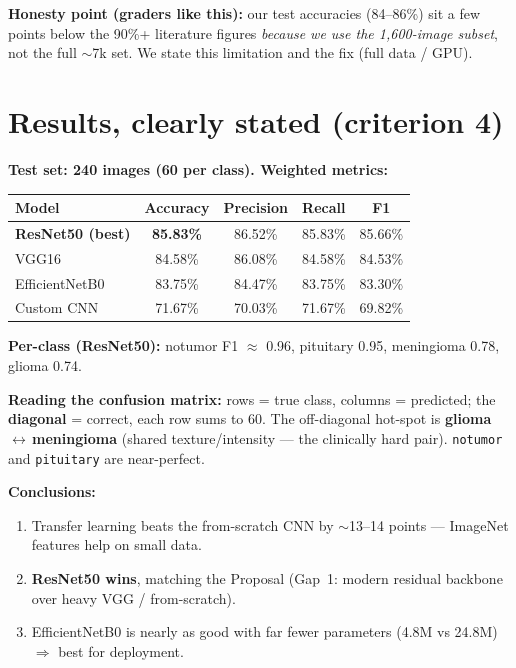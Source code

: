 \documentclass[11pt,a4paper]{article}
\newcommand{\code}[1]{\colorbox{codebg}{\small\texttt{#1}}}
\begin{document}
\begin{keybox}
\textbf{Honesty point (graders like this):} our test accuracies (84--86\%) sit a few points below
the 90\%+ literature figures \emph{because we use the 1{,}600-image subset}, not the full $\sim$7k set.
We state this limitation and the fix (full data / GPU).
\end{keybox}

\section{Results, clearly stated (criterion 4)}
\textbf{Test set: 240 images (60 per class). Weighted metrics:}

\begin{center}
\begin{tabular}{@{}lcccc@{}}
\toprule
\textbf{Model} & \textbf{Accuracy} & \textbf{Precision} & \textbf{Recall} & \textbf{F1} \\
\midrule
\textbf{ResNet50 (best)} & \textbf{85.83\%} & 86.52\% & 85.83\% & 85.66\% \\
VGG16          & 84.58\% & 86.08\% & 84.58\% & 84.53\% \\
EfficientNetB0 & 83.75\% & 84.47\% & 83.75\% & 83.30\% \\
Custom CNN     & 71.67\% & 70.03\% & 71.67\% & 69.82\% \\
\bottomrule
\end{tabular}
\end{center}

\noindent\textbf{Per-class (ResNet50):} notumor F1 $\approx$ 0.96, pituitary 0.95, meningioma 0.78, glioma 0.74.

\begin{keybox}
\textbf{Reading the confusion matrix:}
rows = true class, columns = predicted; the \textbf{diagonal} = correct, each row sums to 60.
The off-diagonal hot-spot is \textbf{glioma\,$\leftrightarrow$\,meningioma} (shared texture/intensity --- the clinically hard pair).
\code{notumor} and \code{pituitary} are near-perfect.
\end{keybox}

\textbf{Conclusions:}
\begin{enumerate}[leftmargin=*,itemsep=1pt]
  \item Transfer learning beats the from-scratch CNN by $\sim$13--14 points --- ImageNet features help on small data.
  \item \textbf{ResNet50 wins}, matching the Proposal (Gap~1: modern residual backbone over heavy VGG / from-scratch).
  \item EfficientNetB0 is nearly as good with far fewer parameters (4.8M vs 24.8M) $\Rightarrow$ best for deployment.
\end{enumerate}
\end{document}
